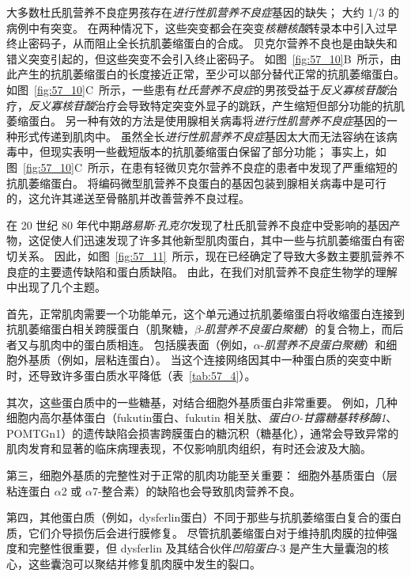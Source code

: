 大多数杜氏肌营养不良症男孩存在\textit{进行性肌营养不良症}基因的缺失；
大约 1/3 的病例中有突变。
在两种情况下，这些突变都会在突变\textit{核糖核酸}转录本中引入过早终止密码子，从而阻止全长抗肌萎缩蛋白的合成。
贝克尔营养不良也是由缺失和错义突变引起的，但这些突变不会引入终止密码子。
如图~\ref{fig:57_10}B~所示，由此产生的抗肌萎缩蛋白的长度接近正常，至少可以部分替代正常的抗肌萎缩蛋白。
如图~\ref{fig:57_10}C~所示，一些患有\textit{杜氏营养不良症}的男孩受益于\textit{反义寡核苷酸}治疗，\textit{反义寡核苷酸}治疗会导致特定突变外显子的跳跃，产生缩短但部分功能的抗肌萎缩蛋白。
另一种有效的方法是使用腺相关病毒将\textit{进行性肌营养不良症}基因的一种形式传递到肌肉中。
虽然全长\textit{进行性肌营养不良症}基因太大而无法容纳在该病毒中，但现实表明一些截短版本的抗肌萎缩蛋白保留了部分功能；
事实上，如图~\ref{fig:57_10}C~所示，在患有轻微贝克尔营养不良症的患者中发现了严重缩短的抗肌萎缩蛋白。
将编码微型肌营养不良蛋白的基因包装到腺相关病毒中是可行的，这允许其递送至骨骼肌并改善营养不良过程。


在 20 世纪 80 年代中期\textit{路易斯$\cdot$孔克尔}发现了杜氏肌营养不良症中受影响的基因产物，这促使人们迅速发现了许多其他新型肌肉蛋白，其中一些与抗肌萎缩蛋白有密切关系。
因此，如图~\ref{fig:57_11}~所示，现在已经确定了导致大多数主要肌营养不良症的主要遗传缺陷和蛋白质缺陷。
由此，在我们对肌营养不良症生物学的理解中出现了几个主题。


首先，正常肌肉需要一个功能单元，这个单元通过抗肌萎缩蛋白将收缩蛋白连接到抗肌萎缩蛋白相关跨膜蛋白（肌聚糖，$\beta $-\textit{肌营养不良蛋白聚糖}）的复合物上，而后者又与肌肉中的蛋白质相连。
包括膜表面（例如，$\alpha$-\textit{肌营养不良蛋白聚糖}）和细胞外基质（例如，层粘连蛋白）。
当这个连接网络因其中一种蛋白质的突变中断时，还导致许多蛋白质水平降低（表~\ref{tab:57_4}）。


其次，这些蛋白质中的一些糖基，对结合细胞外基质蛋白非常重要。
例如，几种细胞内高尔基体蛋白（fukutin蛋白、fukutin 相关肽、\textit{蛋白O-甘露糖基转移酶1}、POMTGn1）的遗传缺陷会损害跨膜蛋白的糖沉积（糖基化），通常会导致异常的肌肉发育和显著的临床病理表现，不仅影响肌肉组织，有时还会波及大脑。


第三，细胞外基质的完整性对于正常的肌肉功能至关重要：
细胞外基质蛋白（层粘连蛋白 $\alpha$2 或 $\alpha$7-整合素）的缺陷也会导致肌肉营养不良。


第四，其他蛋白质（例如，dysferlin蛋白）不同于那些与抗肌萎缩蛋白复合的蛋白质，它们介导损伤后会进行膜修复。
尽管抗肌萎缩蛋白对于维持肌肉膜的拉伸强度和完整性很重要，但 dysferlin 及其结合伙伴\textit{凹陷蛋白}-3 是产生大量囊泡的核心，这些囊泡可以聚结并修复肌肉膜中发生的裂口。



